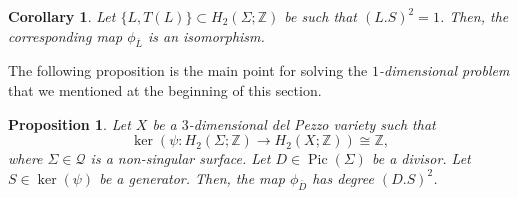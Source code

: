\documentclass[10pt,a4paper]{article}
\numberwithin{equation}{section}
\theoremstyle{definition}
\theoremstyle{plain}
\newtheorem{proposition}[definition]{Proposition}
\newtheorem{corollary}[definition]{Corollary}
\theoremstyle{remark}
\newcommand{\Z}{\mathbb{Z}}
\DeclareMathOperator{\Pic}{Pic}
\begin{document}
\begin{corollary} \label{coro-isomorphism.pencil.picard}
Let $\{L,T(L)\}\subset H_2(\Sigma;\Z)$ be such that $(L.S)^2=1$. Then, the corresponding map $\phi_{\overline{L}}$ is an isomorphism. 
\end{corollary}

The following proposition is the main point for solving the \textit{$1$-dimensional problem} that we mentioned at the beginning of this section.


\begin{proposition} \label{Prop-degree.case.complex}
  Let $X$ be a $3$-dimensional del Pezzo variety such that
  $$\ker(\psi\colon  H_2(\Sigma;\mathbb{Z})\to H_2(X;\mathbb{Z}))\cong \Z,$$
  where $\Sigma\in \mathcal{Q}$ is a non-singular surface. Let $D\in \Pic(\Sigma)$ be a divisor. Let  $S\in \ker(\psi)$ be a generator.  Then, the map $\phi_{\overline{D}}$ has degree $(D.S)^2$.
\end{proposition} 
\end{document}
